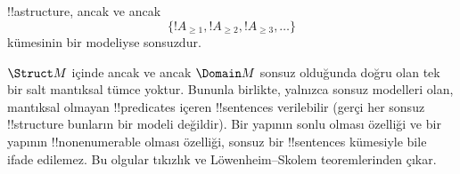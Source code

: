 \begin{prop}
!!a{structure}, ancak ve ancak
\[
\{!A_{\ge 1}, !A_{\ge 2}, !A_{\ge 3}, \dots \}
\]
kümesinin bir modeliyse sonsuzdur.
\end{prop}

$\Struct M$ içinde ancak ve ancak $\Domain M$ sonsuz olduğunda doğru
olan tek bir salt mantıksal tümce yoktur. Bununla birlikte, yalnızca
sonsuz modelleri olan, mantıksal olmayan !!{predicate}s içeren
!!{sentence}s verilebilir (gerçi her sonsuz !!{structure} bunların bir
modeli değildir). Bir yapının sonlu olması özelliği ve bir yapının
!!{nonenumerable} olması özelliği, sonsuz bir !!{sentence}s kümesiyle
bile ifade edilemez. Bu olgular tıkızlık ve Löwenheim--Skolem
teoremlerinden çıkar.

